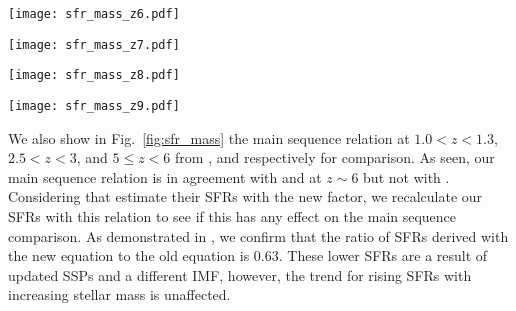 \documentclass[twocolumn]{aastex63}
\begin{document}
\begin{figure*}
\centering
\begin{minipage}{0.45\textwidth}
\centering
\texttt{[image: sfr\_mass\_z6.pdf]}
\end{minipage}
\begin{minipage}{0.45\textwidth}
\centering
\texttt{[image: sfr\_mass\_z7.pdf]}
\end{minipage}
\begin{minipage}{0.45\textwidth}
\centering
\texttt{[image: sfr\_mass\_z8.pdf]}
\end{minipage}
\begin{minipage}{0.45\textwidth}
\centering
\texttt{[image: sfr\_mass\_z9.pdf]}
\end{minipage}
\caption{The main sequence relation between stellar mass and SFR $z=6-9$. The filled yellow circles show the results for individual galaxies whereas the black circles show the median values of SFRs in each stellar mass bin of $1M_{\odot}$, with the uncertainties being the errors on the median. The solid red lines show a linear fit through the median points. The main sequence relation at $1.0<z<1.3$, $2.5<z<3$, and $5\leq z<6$ from \citet{Lee2015}, \citet{Bauer2011} and \citet{Santini2017} are shown by dotted red, dot-dashed blue and dashed magenta lines respectively at $z\sim6$. The dot-dashed blue line of \citet{Bauer2011} has been extrapolated to lower masses at $z\sim6$ and is copied on other redshifts as a reference point to examine the evolution in the main sequence relation. }
\label{fig:sfr_mass}
\end{figure*}

We also show in Fig.~\ref{fig:sfr_mass} the main sequence relation at $1.0<z<1.3$, $2.5<z<3$, and $5\leq z<6$ from \citet{Lee2015}, \citet{Bauer2011} and \citet{Santini2017} respectively for comparison. As seen, our main sequence relation is in agreement with \citet{Lee2015} and \citet{Bauer2011} at $z\sim6$ but not with \citet{Santini2017}. Considering that \citet{Santini2017} estimate their SFRs with the new \citet{Kennicutt2012} factor, we recalculate our SFRs with this relation to see if this has any effect on the main sequence comparison. As demonstrated in \citet{Kennicutt2012}, we confirm that the ratio of SFRs derived with the new equation to the old \citet{Kennicutt1998} equation is 0.63. These lower SFRs are a result of updated SSPs and a different IMF, however, the trend for rising SFRs with increasing stellar mass is unaffected.
\end{document}
